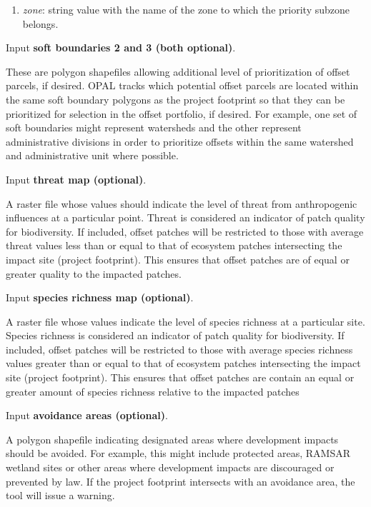 \documentclass[11pt,letterpaper]{report}
\newenvironment{myenumerate}{%
	\edef\backupindent{\the\parindent}
	\enumerate
	\setlength{\parindent}{\backupindent}
		\setlist[enumerate,1]{label=(\arabic*)}
		\setlist[enumerate,2]{label=(\arabic*)}
}{\endenumerate}
\begin{document}
\begin{myenumerate}
			\begin{enumerate}[leftmargin=0.5in,labelindent=!,itemindent=-0.02in]
				\item	{\em zone}: string value with the name of the zone to which the priority subzone belongs. 
			\end{enumerate}	
				
		\item Input \textbf{soft boundaries 2 and 3 (both optional)}.
		
			These are polygon shapefiles allowing additional level of prioritization of offset parcels, if desired. OPAL tracks which potential offset parcels are located within the same soft boundary  polygons as the project footprint so that they can be prioritized for selection in the offset portfolio, if desired. For example, one set of soft boundaries might represent watersheds and the other represent administrative divisions in order to prioritize offsets within the same watershed and administrative unit where possible.
		
		\item Input \textbf{threat map (optional)}.
		
			A raster file whose values should indicate the level of threat from anthropogenic influences at a particular point. Threat is considered an indicator of patch quality for biodiversity. If included, offset patches will be restricted to those with average threat values less than or equal to that of ecosystem patches intersecting the impact site (project footprint). This ensures that offset patches are of equal or greater quality to the impacted patches. 
		
		\item  Input \textbf{species richness map (optional)}.
		
			A raster file whose values indicate the level of species richness at a particular site. Species richness is considered an indicator of patch quality for biodiversity. If included, offset patches will be restricted to those with average species richness values greater than or equal to that of ecosystem patches intersecting the impact site (project footprint). This ensures that offset patches are contain an equal or greater amount of species richness relative to the impacted patches
				
		\item Input \textbf{avoidance areas (optional)}.
		
			A polygon shapefile indicating designated areas where development impacts should be avoided. For example, this might include protected areas, RAMSAR wetland sites or other areas where development impacts are discouraged or prevented by law. If the project footprint intersects with an avoidance area, the tool will issue a warning. 
				

\end{myenumerate}
\end{document}
